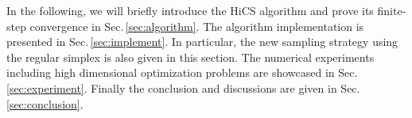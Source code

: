 \documentclass[final,1p,times]{elsarticle}
\begin{document}
%
%
%

In the following, we will briefly introduce the HiCS algorithm and
prove its finite-step convergence in Sec.\,\ref{sec:algorithm}. 
The algorithm implementation is presented in Sec.\,\ref{sec:implement}.
In particular, the new sampling strategy using the regular simplex is
also given in this section.
The numerical experiments including high dimensional optimization
problems are showcased in Sec.\,\ref{sec:experiment}. 
Finally the conclusion and discussions are given in Sec.\,\ref{sec:conclusion}.
\end{document}
